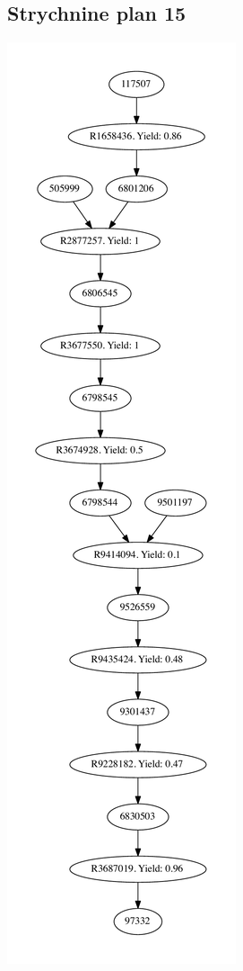 \documentclass[a4paper,10pt,titlepage]{paper}
\begin{document}
\subsection{Strychnine plan 15}
\centering
\includegraphics[scale=0.4]{Synteseplaner/Strychnine/plan15.pdf}
\label{Appendix::Strychnine15}
\end{document}
